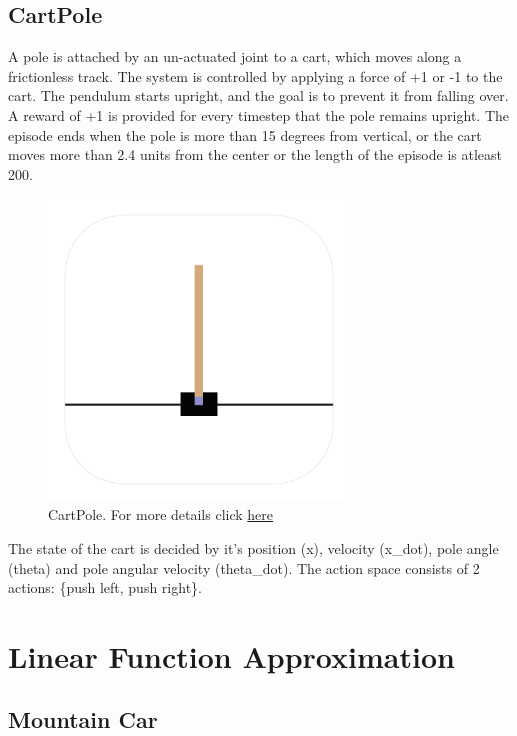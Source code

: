 \documentclass{article}
\begin{document}
    \subsection{CartPole}
    A pole is attached by an un-actuated joint to a cart, which moves along a frictionless track. The system is controlled by applying a 
    force of +1 or -1 to the cart. The pendulum starts upright, and the goal is to prevent it from falling over. A reward of +1 is provided for
    every timestep that the pole remains upright. The episode ends when the pole is more than 15 degrees from vertical, or the cart moves more 
    than 2.4 units from the center or the length of the episode is atleast 200.\par
    
    \begin{figure}[H]
        \graphicspath{ {../tmp/} }
        \begin{center}
        \includegraphics[width=8cm]{cartpole.png}
        \end{center}
        \caption{CartPole. For more details click \href{https://gym.openai.com/envs/CartPole-v1/}{here} }
        \label{policy_iter_jack_problem}
    \end{figure}
    
    \noindent %
    The state of the cart is decided by it's position (x), velocity (x\_dot), pole angle (theta) and pole angular velocity (theta\_dot). The action space
    consists of 2 actions: \{push left, push right\}.

\section{Linear Function Approximation}
    \subsection{Mountain Car}
\end{document}
